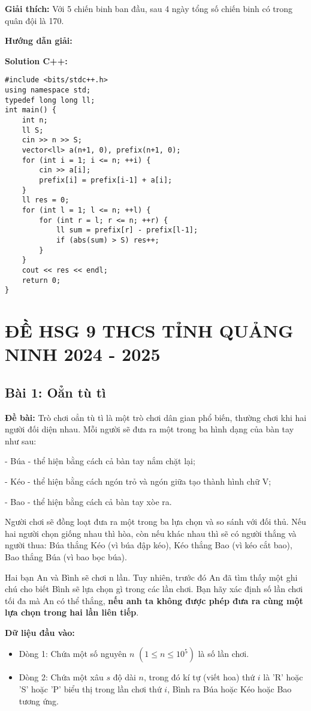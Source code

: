 \documentclass[12pt]{scrartcl}  %
\begin{document}
\textbf{Giải thích:}
Với 5 chiến binh ban đầu, sau 4 ngày tổng
số chiến binh có trong quân đội là 170.

\textbf{Hướng dẫn giải:}

\textbf{Solution C++:}
\begin{lstlisting}
#include <bits/stdc++.h>
using namespace std;
typedef long long ll;
int main() {
    int n;
    ll S;
    cin >> n >> S;
    vector<ll> a(n+1, 0), prefix(n+1, 0);
    for (int i = 1; i <= n; ++i) {
        cin >> a[i];
        prefix[i] = prefix[i-1] + a[i];
    }
    ll res = 0;
    for (int l = 1; l <= n; ++l) {
        for (int r = l; r <= n; ++r) {
            ll sum = prefix[r] - prefix[l-1];
            if (abs(sum) > S) res++;
        }
    }
    cout << res << endl;
    return 0;
}
\end{lstlisting}

\section{ĐỀ HSG 9 THCS TỈNH QUẢNG NINH 2024 - 2025}

\subsection{Bài 1: Oẳn tù tì}
\textbf{Đề bài:}
Trò chơi oẳn tù tì là một trò chơi dân gian phổ biến, thường chơi khi hai người đối diện nhau. Mỗi người sẽ đưa ra một trong ba hình dạng của bàn tay như sau:

- Búa - thể hiện bằng cách cả bàn tay nắm chặt lại;

- Kéo - thể hiện bằng cách ngón trỏ và ngón giữa tạo thành hình chữ V;

- Bao - thể hiện bằng cách cả bàn tay xòe ra.

Người chơi sẽ đồng loạt đưa ra một trong ba lựa chọn và so sánh với đối thủ. Nếu hai người chọn giống nhau thì hòa, còn nếu khác nhau thì sẽ có người thắng và người thua: Búa thắng Kéo (vì búa đập kéo), Kéo thắng Bao (vì kéo cắt bao), Bao thắng Búa (vì bao bọc búa).

Hai bạn An và Bình sẽ chơi n lần. Tuy nhiên, trước đó An đã tìm thấy một ghi chú cho biết Bình sẽ lựa chọn gì trong các lần chơi. Bạn hãy xác định số lần chơi tối đa mà An có thể thắng, \textbf{nếu anh ta không được phép đưa ra cùng một lựa chọn trong hai lần liên tiếp}.

\textbf{Dữ liệu đầu vào:}
\begin{itemize}
    \item Dòng 1: Chứa một số nguyên $n$ $(1 \leq n \leq 10^5)$ là số lần chơi.
    \item Dòng 2: Chứa một xâu $s$ độ dài $n$, trong đó kí tự (viết hoa) thứ $i$ là 'R' hoặc 'S' hoặc 'P' biểu thị trong lần chơi
thứ $i$, Bình ra Búa hoặc Kéo hoặc Bao tương ứng.
\end{itemize}
\end{document}
